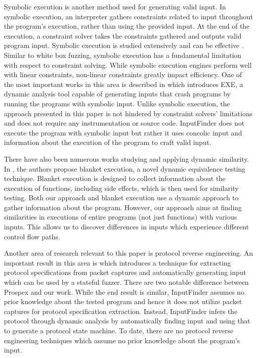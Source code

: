 \documentclass{acm_proc_article-sp}
\def \tool {InputFinder}
\begin{document}
Symbolic execution is another method used for generating valid input.
In symbolic execution, an interpreter gathers constraints related to input throughout the program's execution, rather than using the provided input.
At the end of the execution, a constraint solver takes the constraints gathered and outputs valid program input.
Symbolic execution is studied extensively and can be effective \cite{symbolicexecution, exesymex}.
Similar to white box fuzzing, symbolic execution has a fundamental limitation with respect to constraint solving.
While symbolic execution engines perform well with linear constraints, non-linear constraints greatly impact efficiency.
One of the most important works in this area is described in \cite{exesymex} which introduces EXE, a dynamic analysis tool capable of generating inputs that crash programs by running the programs with symbolic input.
Unlike symbolic execution, the approach presented in this paper is not hindered by constraint solvers' limitations and does not require any instrumentation or source code.
\tool{} does not execute the program with symbolic input but rather it uses concolic input and information about the execution of the program to craft valid input.

There have also been numerous works studying and applying dynamic similarity.
In \cite{blanketexec}, the authors propose blanket execution, a novel dynamic equivalence testing technique.
Blanket execution is designed to collect information about the execution of functions, including side effects, which is then used for similarity testing.
Both our approach and blanket execution use a dynamic approach to gather information about the program.
However, our approach aims at finding similarities in executions of entire programs (not just functions) with various inputs.
This allows us to discover differences in inputs which experience different control flow paths.

Another area of research relevant to this paper is protocol reverse engineering.
An important result in this area is \cite{prospex} which introduces a technique for extracting protocol specifications from packet captures and automatically generating input which can be used by a stateful fuzzer.
There are two notable difference between Prospex and our work.
While the end result is similar, \tool{} assumes no prior knowledge about the tested program and hence it does not utilize packet captures for protocol specification extraction.
Instead, \tool{} infers the protocol through dynamic analysis by automatically finding input and using that to generate a protocol state machine.
To date, there are no protocol reverse engineering techniques which assume no prior knowledge about the program's input.
\end{document}
